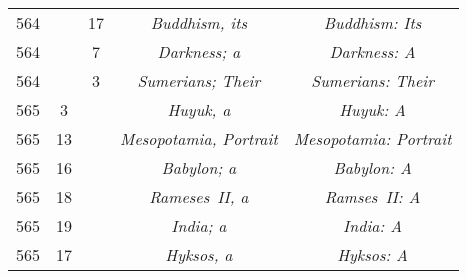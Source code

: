 \documentclass[a4paper,11pt]{article}
\numberwithin{equation}{section}
\begin{document}
\begin{center}
\begin{tabular}{|c|c|c|c|c|}
    564 & & 17 & \textit{Buddhism, its} & \textit{Buddhism: Its} \\
    564 & & \hphantom{0}7 & \textit{Darkness; a} & \textit{Darkness: A} \\
    564 & & \hphantom{0}3 & \textit{Sumerians; Their}
    & \textit{Sumerians: Their} \\
    565 & \hphantom{0}3 & & \textit{Huyuk, a} & \textit{Huyuk: A} \\
    565 & 13 & & \textit{Mesopotamia, Portrait}
           & \textit{Mesopotamia: Portrait} \\
    565 & 16 & & \textit{Babylon; a} & \textit{Babylon: A} \\
    565 & 18 & & \textit{Rameses~II, a} & \textit{Ramses~II: A} \\
    565 & 19 & & \textit{India; a} & \textit{India: A} \\
    565 & 17 & & \textit{Hyksos, a} & \textit{Hyksos: A} \\
    \hline
  \end{tabular}





  \newpage


\end{center}
\end{document}
